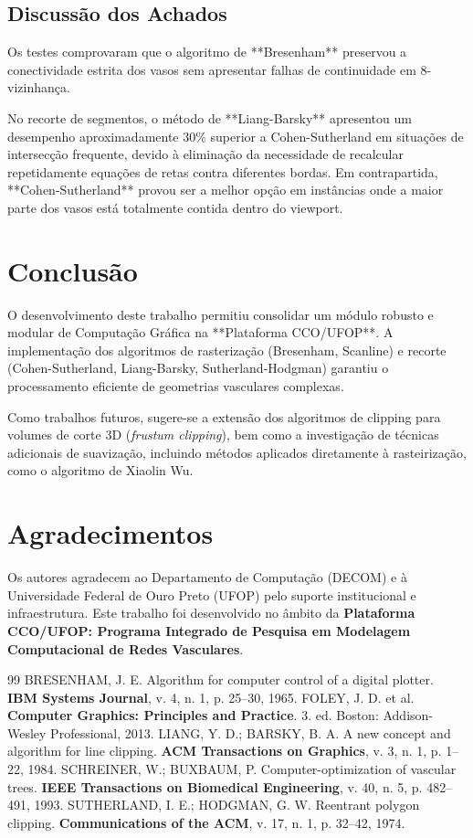 \documentclass[11pt, a4paper]{article}
\begin{document}
\subsection{Discussão dos Achados}
Os testes comprovaram que o algoritmo de **Bresenham** preservou a conectividade estrita dos vasos sem apresentar falhas de continuidade em 8-vizinhança. 

No recorte de segmentos, o método de **Liang-Barsky** apresentou um desempenho aproximadamente 30\% superior a Cohen-Sutherland em situações de intersecção frequente, devido à eliminação da necessidade de recalcular repetidamente equações de retas contra diferentes bordas. Em contrapartida, **Cohen-Sutherland** provou ser a melhor opção em instâncias onde a maior parte dos vasos está totalmente contida dentro do viewport.

\section{Conclusão}
O desenvolvimento deste trabalho permitiu consolidar um módulo robusto e modular de Computação Gráfica na **Plataforma CCO/UFOP**. A implementação dos algoritmos de rasterização (Bresenham, Scanline) e recorte (Cohen-Sutherland, Liang-Barsky, Sutherland-Hodgman) garantiu o processamento eficiente de geometrias vasculares complexas.

Como trabalhos futuros, sugere-se a extensão dos algoritmos de clipping para volumes de corte 3D (\textit{frustum clipping}), bem como a investigação de técnicas adicionais de suavização, incluindo métodos aplicados diretamente à rasteirização, como o algoritmo de Xiaolin Wu. 

\section*{Agradecimentos}
Os autores agradecem ao Departamento de Computação (DECOM) e à Universidade Federal de Ouro Preto (UFOP) pelo suporte institucional e infraestrutura. Este trabalho foi desenvolvido no âmbito da \textbf{Plataforma CCO/UFOP: Programa Integrado de Pesquisa em Modelagem Computacional de Redes Vasculares}.

\begin{thebibliography}{99}
   BRESENHAM, J. E. Algorithm for computer control of a digital plotter. \textbf{IBM Systems Journal}, v. 4, n. 1, p. 25--30, 1965.
   FOLEY, J. D. et al. \textbf{Computer Graphics: Principles and Practice}. 3. ed. Boston: Addison-Wesley Professional, 2013.
   LIANG, Y. D.; BARSKY, B. A. A new concept and algorithm for line clipping. \textbf{ACM Transactions on Graphics}, v. 3, n. 1, p. 1--22, 1984.
   SCHREINER, W.; BUXBAUM, P. Computer-optimization of vascular trees. \textbf{IEEE Transactions on Biomedical Engineering}, v. 40, n. 5, p. 482--491, 1993.
   SUTHERLAND, I. E.; HODGMAN, G. W. Reentrant polygon clipping. \textbf{Communications of the ACM}, v. 17, n. 1, p. 32--42, 1974.
\end{thebibliography}
\end{document}
